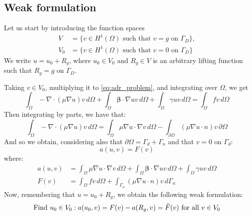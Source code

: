 \documentclass{article}
\begin{document}
\subsection{Weak formulation}
Let us start by introducing the function spaces
\begin{align}
    V &= \{v \in H^1(\Omega) \text{ such that } v = g \text{ on } \Gamma_D \} , \label{eq:2} \\
    V_0 &= \{v \in H^1(\Omega) \text{ such that } v = 0 \text{ on } \Gamma_D\}  \label{eq:3}
\end{align}
We write $u = u_0 + R_g$, where $u_0 \in V_0$ and $R_g \in V$ is an arbitrary lifting function such that $R_g = g$ on $\Gamma_D$.

Taking $v \in V_0$, multiplying it to \eqref{eq:adr_problem}, and integrating over $\Omega$, we get
\begin{equation}
    \int_{\Omega} -\nabla \cdot (\mu\nabla u) v \,d{\Omega} + \int_{\Omega} \boldsymbol{\beta} \cdot \nabla u v \,d{\Omega} + \int_{\Omega} \gamma u v \,d{\Omega} = \int_{\Omega} f v \,d{\Omega}
\end{equation}
Then integrating by parts, we have that:
\begin{equation}
    \int_{\Omega} -\nabla \cdot (\mu\nabla u) v \,d{\Omega} =  \int_{\Omega} \mu \nabla u \cdot \nabla v \,d{\Omega} - \int_{\partial\Omega} (\mu \nabla u \cdot n) v \,{\partial\Omega}
\end{equation}
And so we obtain, considering also that $\partial\Omega = \Gamma_d + \Gamma_n$ and that $v = 0$ on $\Gamma_d$:
\begin{equation}
   a(u,v)=F(v)
\end{equation}
where:
\begin{align}
    a(u,v) &= \int_{\Omega} \mu \nabla u \cdot \nabla v \,d{\Omega} + \int_{\Omega} \boldsymbol{\beta} \cdot \nabla u v \,d{\Omega} + \int_{\Omega} \gamma u v \,d{\Omega}\\
    F(v) &= \int_{\Omega} f v \,d{\Omega} + \int_{\Gamma_n} (\mu \nabla u \cdot n) v \,d{\Gamma_n}
\end{align}
Now, remembering that $u = u_0 + R_g$, we obtain the following weak formulation:
\begin{equation}\label{eq:weak}
    \text{Find } u_0 \in V_0 : a(u_0,v) = F(v) - a(R_g,v) = \Tilde{F}(v) \text{  for all } v \in V_0
\end{equation}
\end{document}
